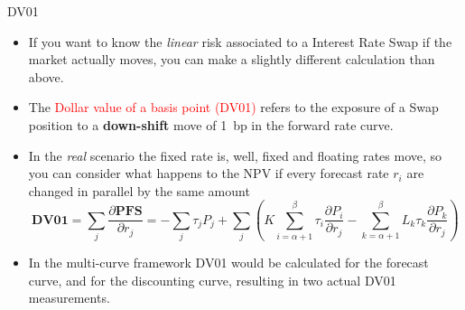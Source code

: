 \documentclass{beamer}
\begin{document}
\begin{frame}{DV01}
\begin{itemize}
	\item<1-> If you want to know the \emph{linear} risk associated to a Interest Rate Swap if the market actually moves, you can make a slightly different calculation than above.
	\item<2-> The \textcolor{red}{Dollar value of a basis point (DV01)} refers to the exposure of a Swap position to a \textbf{down-shift} move of 1~bp in the forward rate curve.
	\item<3-> In the \emph{real} scenario the fixed rate is, well, fixed and floating rates move, so you can consider what happens to the NPV if every forecast rate $r_i$ are changed in parallel by the same amount
	\begin{equation*}
	\textbf{DV01} = \sum_j \frac{\partial \textbf{PFS}}{\partial r_j} = -\sum_{j}\tau_jP_j+\sum_{j}\left(K\sum_{i=\alpha+1}^\beta\tau_i\frac{\partial P_i}{\partial r_j} - \sum_{k=\alpha+1}^\beta L_k\tau_k\frac{\partial P_k}{\partial r_j}\right)
	\end{equation*}
	\item<4-> In the multi-curve framework DV01 would be calculated for the forecast curve, and for the discounting curve, resulting in two actual DV01 measurements.
\end{itemize}
\end{frame}

\end{document}

